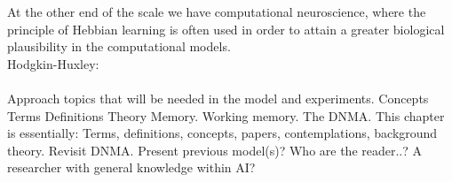 At the other end of the scale we have computational neuroscience,  where the principle of Hebbian learning is often used in order to attain a greater biological plausibility in the computational models.
\\

Hodgkin-Huxley:
\\\\

Approach topics that will be needed in the model and experiments.
Concepts
Terms
Definitions
Theory
Memory. Working memory.
The DNMA.
This chapter is essentially: Terms, definitions, concepts, papers, contemplations, background theory. Revisit DNMA.
Present previous model(s)?
Who are the reader..? A researcher with general knowledge within AI?


\cleardoublepage